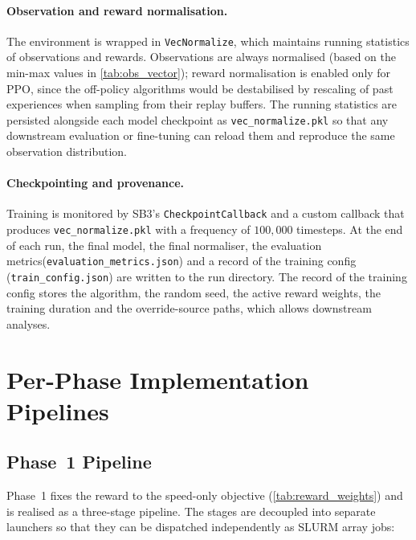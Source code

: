 \paragraph{Observation and reward normalisation.}
The environment is wrapped in \texttt{VecNormalize}, which maintains running statistics of observations and rewards. Observations are always normalised (based on the min-max values in \autoref{tab:obs_vector}); reward normalisation is enabled only for PPO, since the off-policy algorithms would be destabilised by rescaling of past experiences when sampling from their replay buffers. The running statistics are persisted alongside each model checkpoint as \texttt{vec\_normalize.pkl} so that any downstream evaluation or fine-tuning can reload them and reproduce the same observation distribution.

\paragraph{Checkpointing and provenance.}
Training is monitored by SB3's \texttt{CheckpointCallback} and a custom callback that produces \texttt{vec\_normalize.pkl} with a frequency of $100{,}000$ timesteps. At the end of each run, the final model, the final normaliser, the evaluation metrics\linebreak (\texttt{evaluation\_metrics.json}) and a record of the training config (\texttt{train\_config.json}) are written to the run directory. The record of the training config stores the algorithm, the random seed, the active reward weights, the training duration and the override-source paths, which allows downstream analyses.

\section{Per-Phase Implementation Pipelines}
\label{sec:impl_pipelines}

\subsection{Phase~1 Pipeline}
\label{subsec:impl_phase1_pipeline}
Phase~1 fixes the reward to the speed-only objective (\autoref{tab:reward_weights}) and is realised as a three-stage pipeline. The stages are decoupled into separate launchers so that they can be dispatched independently as SLURM array jobs:

